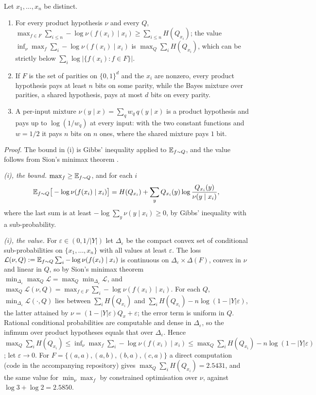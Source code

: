 \begin{proposition}\label{prop:absorb:pricing}
Let $x_1,\dots,x_n$ be distinct.
\begin{enumerate}[label=(\roman*),itemsep=0pt,topsep=2pt]
\item For every product hypothesis $\nu$ and every $Q$, $\max_{f\in F}\sum_{i\le n}-\log\nu(f(x_i)\mid x_i)\ge\sum_{i\le n}H(Q_{x_i})$; the value $\inf_\nu\max_f\sum_i-\log\nu(f(x_i)\mid x_i)$ is $\max_Q\sum_iH(Q_{x_i})$, which can be strictly below $\sum_i\log|\{f(x_i):f\in F\}|$.
\item If $F$ is the set of parities on $\{0,1\}^d$ and the $x_i$ are nonzero, every product hypothesis pays at least $n$ bits on some parity, while the Bayes mixture over parities, a shared hypothesis, pays at most $d$ bits on every parity.
\item A per-input mixture $\nu(y\mid x)=\sum_qw_q\,q(y\mid x)$ is a product hypothesis and pays up to $\log(1/w_q)$ at every input: with the two constant functions and $w=1/2$ it pays $n$ bits on $n$ ones, where the shared mixture pays $1$ bit.
\end{enumerate}
\end{proposition}

\emph{Proof.} The bound in (i) is Gibbs' inequality applied to $\mathbb{E}_{f\sim Q}$, and the value follows from Sion's minimax theorem \citep{sion1958general}.

\emph{(i), the bound.} $\max_f\ge\mathbb{E}_{f\sim Q}$, and for each $i$
\[
\mathbb{E}_{f\sim Q}\big[-\log\nu(f(x_i)\mid x_i)\big]=H(Q_{x_i})+\sum_yQ_{x_i}(y)\log\frac{Q_{x_i}(y)}{\nu(y\mid x_i)},
\]
where the last sum is at least $-\log\sum_y\nu(y\mid x_i)\ge0$, by Gibbs' inequality with a sub-probability.

\emph{(i), the value.} For $\varepsilon\in(0,1/|Y|)$ let $\Delta_\varepsilon$ be the compact convex set of conditional sub-probabilities on $\{x_1,\dots,x_n\}$ with all values at least $\varepsilon$. The loss $\mathcal L(\nu,Q):=\mathbb{E}_{f\sim Q}\sum_i-\log\nu(f(x_i)\mid x_i)$ is continuous on $\Delta_\varepsilon\times\Delta(F)$, convex in $\nu$ and linear in $Q$, so by Sion's minimax theorem \citep{sion1958general} $\min_{\Delta_\varepsilon}\max_Q\mathcal L=\max_Q\min_{\Delta_\varepsilon}\mathcal L$, and $\max_Q\mathcal L(\nu,Q)=\max_{f\in F}\sum_i-\log\nu(f(x_i)\mid x_i)$. For each $Q$, $\min_{\Delta_\varepsilon}\mathcal L(\cdot,Q)$ lies between $\sum_iH(Q_{x_i})$ and $\sum_iH(Q_{x_i})-n\log(1-|Y|\varepsilon)$, the latter attained by $\nu=(1-|Y|\varepsilon)Q_x+\varepsilon$; the error term is uniform in $Q$. Rational conditional probabilities are computable and dense in $\Delta_\varepsilon$, so the infimum over product hypotheses equals that over $\Delta_\varepsilon$. Hence $\max_Q\sum_iH(Q_{x_i})\le\inf_\nu\max_f\sum_i-\log\nu(f(x_i)\mid x_i)\le\max_Q\sum_iH(Q_{x_i})-n\log(1-|Y|\varepsilon)$; let $\varepsilon\to0$. For $F=\{(a,a),(a,b),(b,a),(c,a)\}$ a direct computation (code in the accompanying repository) gives $\max_Q\sum_iH(Q_{x_i})=2.5431$, and the same value for $\min_\nu\max_f$ by constrained optimisation over $\nu$, against $\log3+\log2=2.5850$.

